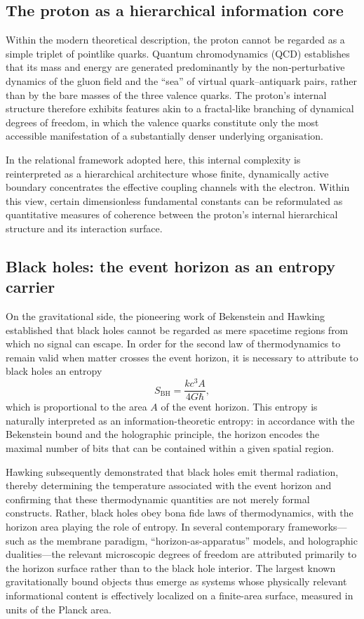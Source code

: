 \documentclass[11pt,a4paper]{article}
\begin{document}
\subsection{The proton as a hierarchical information core}
Within the modern theoretical description, the proton cannot be regarded as a simple triplet of pointlike quarks. Quantum chromodynamics (QCD) establishes that its mass and energy are generated predominantly by the non‑perturbative dynamics of the gluon field and the “sea” of virtual quark–antiquark pairs, rather than by the bare masses of the three valence quarks. The proton’s internal structure therefore exhibits features akin to a fractal‑like branching of dynamical degrees of freedom, in which the valence quarks constitute only the most accessible manifestation of a substantially denser underlying organisation. 

In the relational framework adopted here, this internal complexity is reinterpreted as a hierarchical architecture whose finite, dynamically active boundary concentrates the effective coupling channels with the electron. Within this view, certain dimensionless fundamental constants can be reformulated as quantitative measures of coherence between the proton’s internal hierarchical structure and its interaction surface.

\subsection{Black holes: the event horizon as an entropy carrier}
On the gravitational side, the pioneering work of Bekenstein and Hawking established that black holes cannot be regarded as mere spacetime regions from which no signal can escape. In order for the second law of thermodynamics to remain valid when matter crosses the event horizon, it is necessary to attribute to black holes an entropy
\[
S_{\mathrm{BH}} = \frac{k c^{3} A}{4 G \hbar},
\]
which is proportional to the area \(A\) of the event horizon. This entropy is naturally interpreted as an information-theoretic entropy: in accordance with the Bekenstein bound and the holographic principle, the horizon encodes the maximal number of bits that can be contained within a given spatial region.

Hawking subsequently demonstrated that black holes emit thermal radiation, thereby determining the temperature associated with the event horizon and confirming that these thermodynamic quantities are not merely formal constructs. Rather, black holes obey bona fide laws of thermodynamics, with the horizon area playing the role of entropy. In several contemporary frameworks—such as the membrane paradigm, “horizon-as-apparatus” models, and holographic dualities—the relevant microscopic degrees of freedom are attributed primarily to the horizon surface rather than to the black hole interior. The largest known gravitationally bound objects thus emerge as systems whose physically relevant informational content is effectively localized on a finite-area surface, measured in units of the Planck area.
\end{document}
